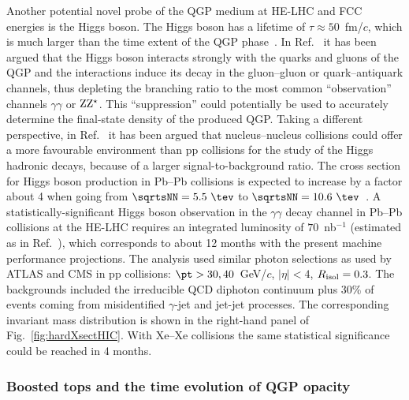 \documentclass[../report.tex]{subfiles}
\begin{document}
Another potential novel probe of the QGP medium at HE-LHC and FCC energies is the
Higgs boson. The Higgs boson has a lifetime of $\tau\approx 50$~fm/$c$, which is much larger than the 
time extent of the QGP phase~\cite{dEnterria:2018bqi,Berger:2018mtg}. 
In Ref.~\cite{dEnterria:2018bqi}
it has been argued that the Higgs boson
interacts strongly with the quarks and gluons of the QGP and the interactions
induce its decay in the gluon--gluon or quark--antiquark channels, thus depleting the 
branching ratio to the most common ``observation'' channels $\gamma\gamma$ or $\rm ZZ^\star$.
This ``suppression'' could potentially be used 
to accurately determine the final-state density of the produced QGP.
Taking a different perspective, in Ref.~\cite{Berger:2018mtg} it has been argued that nucleus--nucleus collisions could offer a more favourable environment than pp collisions for the study of the Higgs hadronic decays, because of a larger signal-to-background ratio.
The cross section for Higgs boson production in Pb--Pb collisions is expected to
increase by a factor about 4 when going from
$\sqrtsNN=5.5~\tev$ to $\sqrtsNN=10.6~\tev$~\cite{dEnterria:2017jyt}.
A statistically-significant Higgs boson observation in the
$\gamma\gamma$ decay channel in Pb--Pb collisions at the HE-LHC 
requires an integrated luminosity of $70$~nb$^{-1}$ 
(estimated as in Ref.~\cite{dEnterria:2017jyt}), which corresponds to about 12 months with the present machine performance
projections. 
The analysis used similar photon selections as used by ATLAS and CMS in pp collisions: 
$\pt > 30,40$~GeV/$c$, $|\eta| < 4$, $R_{\rm isol} = 0.3$. The backgrounds included the irreducible QCD diphoton continuum plus 30\% of events coming from misidentified 
$\gamma$-jet and jet-jet processes. 
The corresponding invariant mass distribution is shown in the right-hand panel of Fig.~\ref{fig:hardXsectHIC}.
With Xe--Xe collisions the same statistical significance could be reached in 4 months.


\subsubsection{Boosted tops and the time evolution of QGP opacity}
\label{sec:HE_boostedtops}
\end{document}
